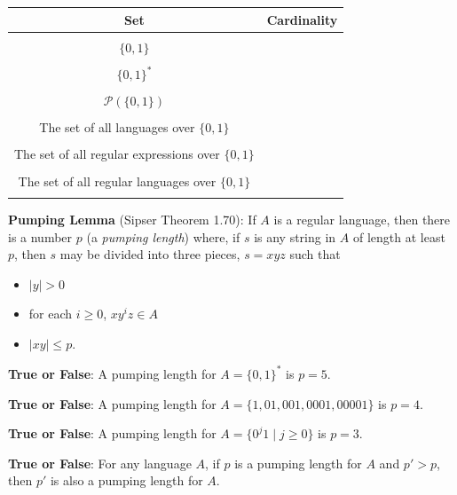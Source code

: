 \documentclass[12pt, oneside]{article}
\begin{document}
\newpage
\begin{center}
\begin{tabular}{c|c}
Set & Cardinality \\
\hline
& \\
$\{0,1\}$ & \\
& \\
$\{0,1\}^*$ & \\
& \\
$\mathcal{P}( \{0,1\})$ & \\
& \\
The set of all languages over $\{0,1\}$ & \\
& \\
The set of all regular expressions over $\{0,1\}$ & \\
& \\
The set of all regular languages over $\{0,1\}$ & \\
& \\
\end{tabular}
\end{center}



\vfill

\newpage

{\bf Pumping Lemma} (Sipser Theorem 1.70): If $A$ is a regular language, then there
is a number $p$ (a {\it pumping length}) where, if $s$ is any string in $A$ of length at least $p$, 
then $s$ may be divided into three pieces, $s = xyz$ such that
\vspace{-10pt}
\begin{itemize}
\item $|y| > 0$
\item for each $i \geq 0$, $xy^i z \in A$
\item $|xy| \leq p$.
\end{itemize}


{\bf True or False}: A pumping length for $A = \{ 0,1 \}^*$ is $p = 5$.

\vspace{100pt}

{\bf True or False}: A pumping length for $A = \{1, 01, 001, 0001, 00001 \}$ is $p = 4$.

\vspace{100pt}

{\bf True or False}: A pumping length for $A = \{0^j 1 \mid  j \geq 0 \}$ is $p = 3$.


\vspace{100pt}

{\bf True or False}: For any language $A$, if $p$  is a  pumping length for $A$ and $p' > p$,  then 
$p'$ is also a pumping length for $A$.
 \vfill
\end{document}
